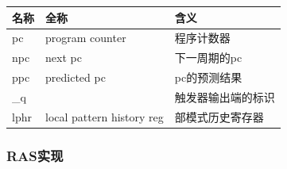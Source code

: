 \begin{longtable}[]{@{}lll@{}}
\toprule\noalign{}
名称 & 全称 & 含义 \\
\midrule\noalign{}
\endhead
\bottomrule\noalign{}
\endlastfoot
pc & program counter & 程序计数器 \\
npc & next pc & 下一周期的pc \\
ppc & predicted pc & pc的预测结果 \\
\_q & & 触发器输出端的标识 \\
lphr & local pattern history reg & 部模式历史寄存器 \\
\end{longtable}

\subsubsection{RAS实现}\label{sec:04-advanced-cpu-005}

